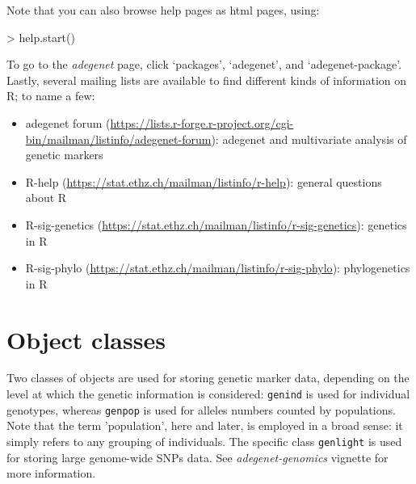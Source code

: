 \documentclass{article}
\begin{document}
Note that you can also browse help pages as html pages, using:
\begin{Schunk}
\begin{Sinput}
> help.start()
\end{Sinput}
\end{Schunk}
To go to the \textit{adegenet} page, click `packages', `adegenet', and
`adegenet-package'.
\\


Lastly, several mailing lists are available to find different kinds of
information on R; to name a few:
\begin{itemize}
\item adegenet forum
  (\url{https://lists.r-forge.r-project.org/cgi-bin/mailman/listinfo/adegenet-forum}):
  adegenet and multivariate analysis of genetic markers
\item R-help (\url{https://stat.ethz.ch/mailman/listinfo/r-help}):
  general questions about R
\item R-sig-genetics
  (\url{https://stat.ethz.ch/mailman/listinfo/r-sig-genetics}):
  genetics in R
\item R-sig-phylo
  (\url{https://stat.ethz.ch/mailman/listinfo/r-sig-phylo}):
  phylogenetics in R
\end{itemize}






\newpage
\section{Object classes}
Two classes of objects are used for storing genetic marker data, depending on the level at which the genetic information is considered:
\texttt{genind} is used for individual genotypes, whereas \texttt{genpop} is used for alleles numbers counted by populations.
Note that the term 'population', here and later, is employed in a broad sense: it simply refers to any grouping of individuals.
The specific class \texttt{genlight} is used for storing large genome-wide SNPs data.
See \textit{adegenet-genomics} vignette for more information.

\end{document}
